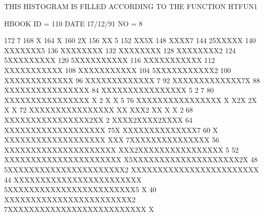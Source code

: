 \begin{Listing}
 THIS HISTOGRAM IS FILLED ACCORDING TO THE FUNCTION HTFUN1                       
 
 HBOOK     ID =       110                                        DATE  17/12/91              NO =   8
 
      172                                    7
      168                                    X
      164                                    X
      160                                   2X
      156                                   XX 5
      152                                   XX5X
      148                                   XXXX7
      144                                 25XXXXX
      140                                 XXXXXXX5
      136                                 XXXXXXXX
      132                                 XXXXXXXX
      128                                 XXXXXXXX2
      124                                5XXXXXXXXX
      120                               5XXXXXXXXXX
      116                               XXXXXXXXXXX
      112                               XXXXXXXXXXX
      108                               XXXXXXXXXXX
      104                              5XXXXXXXXXXX2
      100                              XXXXXXXXXXXXX
       96                              XXXXXXXXXXXXX 7
       92                              XXXXXXXXXXXXX7X
       88                             XXXXXXXXXXXXXXXX
       84                             XXXXXXXXXXXXXXXX 5                              2 7
       80                             XXXXXXXXXXXXXXXX X                        2     X X  5
       76                             XXXXXXXXXXXXXXXX X                        X2X  2X X  X
       72                             XXXXXXXXXXXXXXXX XX                       XXX2 XX X  X 2
       68                             XXXXXXXXXXXXXXXX2XX                    2  XXXX2XXXX2XXXX
       64                             XXXXXXXXXXXXXXXXXXX                  75X  XXXXXXXXXXXXXX7
       60                           X XXXXXXXXXXXXXXXXXXX                  XXX 7XXXXXXXXXXXXXXX
       56                           XXXXXXXXXXXXXXXXXXXXX                  XXX2XXXXXXXXXXXXXXXX 5
       52                           XXXXXXXXXXXXXXXXXXXXXX               X5XXXXXXXXXXXXXXXXXXXX2X
       48                          5XXXXXXXXXXXXXXXXXXXXXX2              XXXXXXXXXXXXXXXXXXXXXXXX
       44                          XXXXXXXXXXXXXXXXXXXXXXXX             5XXXXXXXXXXXXXXXXXXXXXXXX5  X
       40                          XXXXXXXXXXXXXXXXXXXXXXXX2           7XXXXXXXXXXXXXXXXXXXXXXXXXX  X

\end{Listing}
